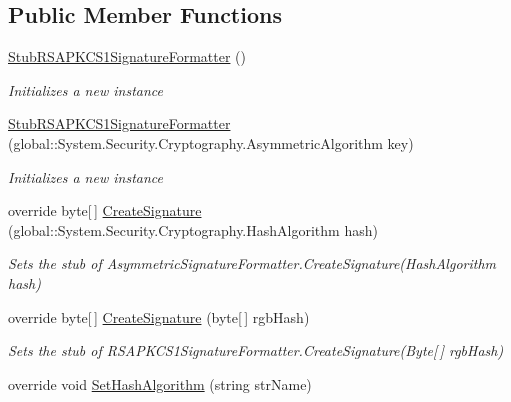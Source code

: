 \subsection*{Public Member Functions}
\begin{DoxyCompactItemize}
\item 
\hyperlink{class_system_1_1_security_1_1_cryptography_1_1_fakes_1_1_stub_r_s_a_p_k_c_s1_signature_formatter_a5dea350946df602eb49bf446e98d84f6}{Stub\-R\-S\-A\-P\-K\-C\-S1\-Signature\-Formatter} ()
\begin{DoxyCompactList}\small\item\em Initializes a new instance\end{DoxyCompactList}\item 
\hyperlink{class_system_1_1_security_1_1_cryptography_1_1_fakes_1_1_stub_r_s_a_p_k_c_s1_signature_formatter_a52a73fb273f7bae376a5a99c16d8255c}{Stub\-R\-S\-A\-P\-K\-C\-S1\-Signature\-Formatter} (global\-::\-System.\-Security.\-Cryptography.\-Asymmetric\-Algorithm key)
\begin{DoxyCompactList}\small\item\em Initializes a new instance\end{DoxyCompactList}\item 
override byte\mbox{[}$\,$\mbox{]} \hyperlink{class_system_1_1_security_1_1_cryptography_1_1_fakes_1_1_stub_r_s_a_p_k_c_s1_signature_formatter_a6e53b227ea27dce35d12766637e5fdf9}{Create\-Signature} (global\-::\-System.\-Security.\-Cryptography.\-Hash\-Algorithm hash)
\begin{DoxyCompactList}\small\item\em Sets the stub of Asymmetric\-Signature\-Formatter.\-Create\-Signature(\-Hash\-Algorithm hash)\end{DoxyCompactList}\item 
override byte\mbox{[}$\,$\mbox{]} \hyperlink{class_system_1_1_security_1_1_cryptography_1_1_fakes_1_1_stub_r_s_a_p_k_c_s1_signature_formatter_aed41f0690a8d54dc310eafa7dc208e0f}{Create\-Signature} (byte\mbox{[}$\,$\mbox{]} rgb\-Hash)
\begin{DoxyCompactList}\small\item\em Sets the stub of R\-S\-A\-P\-K\-C\-S1\-Signature\-Formatter.\-Create\-Signature(\-Byte\mbox{[}$\,$\mbox{]} rgb\-Hash)\end{DoxyCompactList}\item 
override void \hyperlink{class_system_1_1_security_1_1_cryptography_1_1_fakes_1_1_stub_r_s_a_p_k_c_s1_signature_formatter_a851e56533446f21ddd28406b479e1294}{Set\-Hash\-Algorithm} (string str\-Name)

\end{DoxyCompactItemize}
